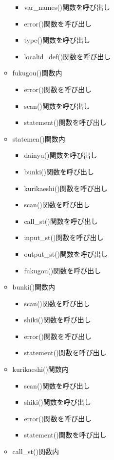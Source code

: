 \documentclass{jarticle}
\begin{document}
\begin{itemize}
\begin{itemize}
\begin{itemize}
      \item var\_names()関数を呼び出し
      \item error()関数を呼び出し
      \item type()関数を呼び出し
      \item localid\_def()関数を呼び出し
    \end{itemize}
    \item fukugou()関数内
    \begin{itemize}
      \item error()関数を呼び出し
      \item scan()関数を呼び出し
      \item statement()関数を呼び出し
    \end{itemize}
    \item statemen()関数内
    \begin{itemize}
      \item dainyu()関数を呼び出し
      \item bunki()関数を呼び出し
      \item kurikaeshi()関数を呼び出し
      \item scan()関数を呼び出し
      \item call\_st()関数を呼び出し
      \item input\_st()関数を呼び出し
      \item output\_st()関数を呼び出し
      \item fukugou()関数を呼び出し
    \end{itemize}
    \item bunki()関数内
    \begin{itemize}
      \item scan()関数を呼び出し
      \item shiki()関数を呼び出し
      \item error()関数を呼び出し
      \item statement()関数を呼び出し
    \end{itemize}
    \item kurikaeshi()関数内
    \begin{itemize}
      \item scan()関数を呼び出し
      \item shiki()関数を呼び出し
      \item error()関数を呼び出し
      \item statement()関数を呼び出し
    \end{itemize}
    \item call\_st()関数内

\end{itemize}
\end{itemize}
\end{document}
